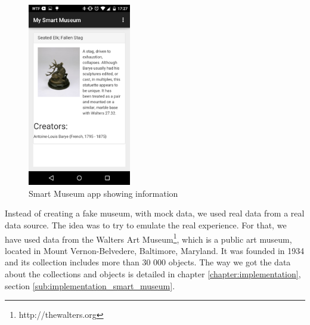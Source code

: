 \begin{figure}[!ht]
  \centering
    \includegraphics[width=0.4\textwidth, keepaspectratio]{images/screenshots/smart_museum_app}
    \caption[Smart Museum]{Smart Museum app showing information}
    \label{fig:smart_museum_app}
\end{figure}

Instead of creating a fake museum, with mock data, we used real data from a real data source.
The idea was to try to emulate the real experience.
For that, we have used data from the Walters Art Museum\footnote{http://thewalters.org}, which is a public art museum, located in Mount Vernon-Belvedere, Baltimore, Maryland.
It was founded in 1934 and its collection includes more than 30 000 objects.
The way we got the data about the collections and objects is detailed in chapter \ref{chapter:implementation}, section \ref{sub:implementation_smart_museum}.

